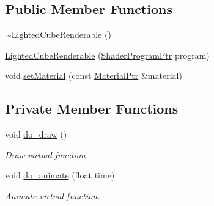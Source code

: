 \subsection*{Public Member Functions}
\begin{DoxyCompactItemize}
\item 
\hyperlink{classLightedCubeRenderable_a5fa09ed9225574f38bae4620f7b38a93}{$\sim$\+Lighted\+Cube\+Renderable} ()
\item 
\hyperlink{classLightedCubeRenderable_a4ed004e7c6705115eb0cfc923d7d4323}{Lighted\+Cube\+Renderable} (\hyperlink{ShaderProgram_8hpp_af8e4af1ad4c53875ee5d32ab7e1f4966}{Shader\+Program\+Ptr} program)
\item 
void \hyperlink{classLightedCubeRenderable_a6dbf380a735cd69da08e80cd506ca7a3}{set\+Material} (const \hyperlink{Material_8hpp_a1d47cd05ca683e287435cf0b363fbfe1}{Material\+Ptr} \&material)
\end{DoxyCompactItemize}
\subsection*{Private Member Functions}
\begin{DoxyCompactItemize}
\item 
void \hyperlink{classLightedCubeRenderable_a62c74cad13c77f9442a8baab0c7d156c}{do\+\_\+draw} ()
\begin{DoxyCompactList}\small\item\em Draw virtual function. \end{DoxyCompactList}\item 
void \hyperlink{classLightedCubeRenderable_a2888876e6b826899dfe0611c0021b161}{do\+\_\+animate} (float time)
\begin{DoxyCompactList}\small\item\em Animate virtual function. \end{DoxyCompactList}\end{DoxyCompactItemize}
